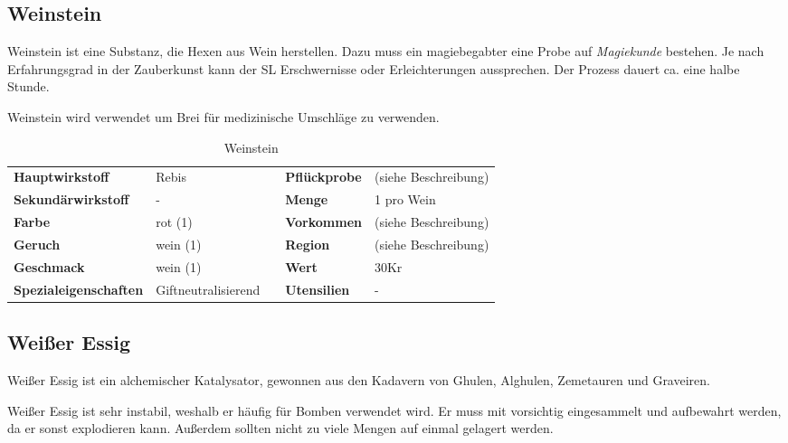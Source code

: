\subsection{Weinstein}
Weinstein ist eine Substanz, die Hexen aus Wein herstellen. Dazu muss ein magiebegabter eine Probe auf \textit{Magiekunde} bestehen. Je nach Erfahrungsgrad in der Zauberkunst kann der SL Erschwernisse oder Erleichterungen aussprechen. Der Prozess dauert ca. eine halbe Stunde.

Weinstein wird verwendet um Brei für medizinische Umschläge zu verwenden.

\begin{table}[h] 
\begin{center} 
\begin{tabular}{|l|l|p{1cm}|l|l|} 
  	\cline{1-2} \cline{4-5} 
  	\textbf{Hauptwirkstoff} & Rebis && \textbf{Pflückprobe} & (siehe Beschreibung) \\ \cline{1-2} \cline{4-5} 
  	\textbf{Sekundärwirkstoff} & - && \textbf{Menge} & 1 pro Wein \\ \cline{1-2} \cline{4-5} 
  	\textbf{Farbe} & rot (1) && \textbf{Vorkommen} & (siehe Beschreibung) \\ \cline{1-2} \cline{4-5} 
  	\textbf{Geruch} & wein (1) && \textbf{Region} & (siehe Beschreibung) \\ \cline{1-2} \cline{4-5} 
  	\textbf{Geschmack} & wein (1) && \textbf{Wert} & 30Kr \\ \cline{1-2} \cline{4-5} 
  	\textbf{Spezialeigenschaften} & Giftneutralisierend && \textbf{Utensilien} & - \\ \cline{1-2} \cline{4-5} 
\end{tabular} 
\end{center} 
\caption{Weinstein} 
\label{tab:weinstein} 
\end{table}


\subsection{Weißer Essig}
Weißer Essig ist ein alchemischer Katalysator, gewonnen aus den Kadavern von Ghulen, Alghulen, Zemetauren und Graveiren. 

Weißer Essig ist sehr instabil, weshalb er häufig für Bomben verwendet wird. Er muss mit vorsichtig eingesammelt und aufbewahrt werden, da er sonst explodieren kann. Außerdem sollten nicht zu viele Mengen auf einmal gelagert werden.

